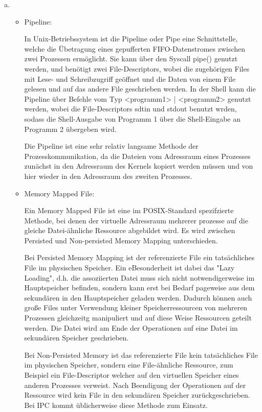 \documentclass[numbers=noendperiod]{scrartcl}
\begin{document}
\begin{enumerate}[a)]
	\item
	\begin{itemize}
		\item Pipeline:
		
		In Unix-Betriebssystem ist die Pipeline oder Pipe eine Schnittstelle, welche die Übetragung eines gepufferten FIFO-Datenstromes zwischen zwei Prozessen ermöglicht.
		Sie kann über den Syscall pipe() genutzt werden, und benötigt zwei File-Descriptors, wobei die zugehörigen Files mit Lese- und Schreibzugriff geöffnet und
		die Daten von einem File gelesen und auf das andere File geschrieben werden. In der Shell kann die Pipeline über Befehle vom Typ <programm1> | <programm2> genutzt werden,
		wobei die File-Descriptors sdtin und stdout benutzt wrden, sodass die Shell-Ausgabe von Programm 1 über die Shell-Eingabe an Programm 2 übergeben wird.
		
		Die Pipeline ist eine sehr relativ langsame Methode der Prozesskommunikation, da die Dateien vom Adressraum eines Prozesses zunächst in den Adressraum des Kernels kopiert werden müssen und von
		hier wieder in den Adressraum des zweiten Prozesses.
		
		\item Memory Mapped File:
		
		Ein Memory Mapped File ist eine im POSIX-Standard spezifzierte Methode, bei denen der virtuelle Adressraum mehrerer prozesse auf die gleiche Datei-ähnliche Ressource abgebildet wird.
		Es wird zwischen Persisted und Non-persisted Memory Mapping unterschieden.
		
		Bei Persisted Memory Mapping ist der referenzierte File ein tatsächliches File im physischen Speicher. Ein eBesonderheit ist dabei das "Lazy Loading", d.h. die assoziierten Datei muss sich
		nicht notwendigerweise im Hauptspeicher befinden, sondern kann erst bei Bedarf pageweise aus dem sekundären in den Hauptspeicher geladen werden. Dadurch können auch große Files unter Verwendung kleiner Speicherressourcen von
		mehreren Prozessen gleichzeitg manipuliert und auf diese Weise Ressourcen geteilt werden. Die Datei wird am Ende der Operationen auf eine Datei im sekundären Speicher geschrieben.
		
		Bei Non-Persisted Memory ist das referenzierte File kein tatsächliches File im physischen Speicher, sondern eine File-ähnliche Ressource, zum Beispiel ein File-Descriptor welcher auf den virtuellen
		Speicher eines anderen Prozesses verweist. Nach Beendigung der Operationen auf der Ressource wird kein File in den sekundären Speicher zurückgeschrieben. Bei IPC kommt üblicherweise diese Methode zum Einsatz.
		

\end{itemize}
\end{enumerate}
\end{document}
